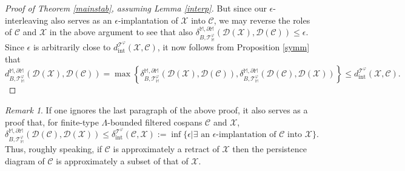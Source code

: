 \documentclass[11pt]{amsart}
\theoremstyle{definition}
\theoremstyle{remark}
\newtheorem{remark}[theorem]{Remark}
\numberwithin{equation}{section}
\def\ep{\epsilon}
\begin{document}
\begin{proof}[Proof of Theorem \ref{mainstab}, assuming Lemma \ref{interp}]
 
But since our $\ep$-interleaving also serves as an $\ep$-implantation of $\mathcal{X}$ into $\mathcal{C}$, we may reverse the roles of $\mathcal{C}$ and $\mathcal{X}$ in the above argument to see that also $\delta_{B,\mathcal{T}_{\mathbb{M}}^{\varphi}}^{\mathbb{M},\partial\mathbb{M}}(\mathcal{D}(\mathcal{X}),\mathcal{D}(\mathcal{C}))\leq \ep$. Since $\ep$ is arbitrarily close to $d_{\mathrm{int}}^{\mathcal{T}^{\varphi}}(\mathcal{X},\mathcal{C})$, it now follows from  Proposition \ref{symm} that
\[	d_{B,\mathcal{T}_{\mathbb{M}}^{\varphi}}^{\mathbb{M},\partial\mathbb{M}}(\mathcal{D}(\mathcal{X}),\mathcal{D}(\mathcal{C}))=\max\left\{\delta_{B,\mathcal{T}_{\mathbb{M}}^{\varphi}}^{\mathbb{M},\partial\mathbb{M}}(\mathcal{D}(\mathcal{X}),\mathcal{D}(\mathcal{C})),\delta_{B,\mathcal{T}_{\mathbb{M}}^{\varphi}}^{\mathbb{M},\partial\mathbb{M}}(\mathcal{D}(\mathcal{C}),\mathcal{D}(\mathcal{X}))  \right\}\leq d_{\mathrm{int}}^{\mathcal{T}^{\varphi}}(\mathcal{X},\mathcal{C}).\]
\end{proof}

\begin{remark}
If one ignores the last paragraph of the above proof, it also serves as a proof that, for finite-type $\Lambda$-bounded filtered cospans $\mathcal{C}$ and $\mathcal{X}$, \[ \delta_{B,\mathcal{T}_{\mathbb{M}}^{\varphi}}^{\mathbb{M},\partial\mathbb{M}}(\mathcal{D}(\mathcal{C}),\mathcal{D}(\mathcal{X}))\leq \delta_{\mathrm{int}}^{\mathcal{T}^{\varphi}}(\mathcal{C},\mathcal{X}):=\inf\{\ep|\exists\mbox{ an $\ep$-implantation of }\mathcal{C}\mbox{ into }\mathcal{X}\}.\]  Thus, roughly speaking, if $\mathcal{C}$ is approximately a retract of $\mathcal{X}$ then the persistence diagram of $\mathcal{C}$ is approximately a subset of that of $\mathcal{X}$.
\end{remark}
\end{document}
